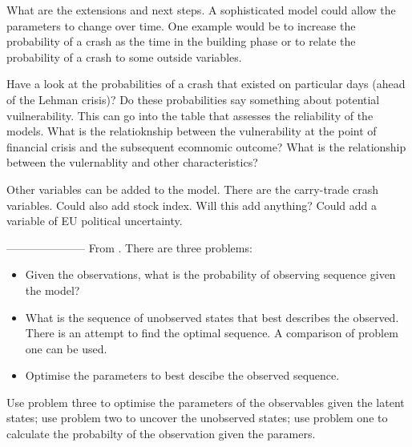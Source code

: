 \documentclass[12pt, a4paper, oneside]{article} %
\begin{document}
What are the extensions and next steps.  A sophisticated model could allow the parameters to change over time.  One example would be to increase the probability of a crash as the time in the building phase or to relate the probability of a crash to some outside variables. 

Have a look at the probabilities of a crash that existed on particular days (ahead of the Lehman crisis)?  Do these probabilities say something about potential vuilnerability.  This can go into the table that assesses the reliability of the models.  What is the relatioknship between the vulnerability at the point of financial crisis and the subsequent ecomnomic outcome?  What is the relationship between the vulernablity and other characteristics? 

Other variables can be added to the model.  There are the carry-trade crash variables.  Could also add stock index. Will this add anything?  Could add a variable of EU political uncertainty. 


---------------------
From \citet{rabiner1989tutorial}.  There are three problems:
\begin{itemize}
\item Given the observations, what is the probability of observing sequence given the model? 
\item What is the sequence of unobserved states that best describes the observed.  There is an attempt to find the optimal sequence.  A comparison of problem one can be used. 
\item Optimise the parameters to best descibe the observed sequence. 
\end{itemize}

Use problem three to optimise the parameters of the observables given the latent states; use problem two to uncover the unobserved states; use problem one to calculate the probabilty of the observation given the paramers. 
\end{document}
